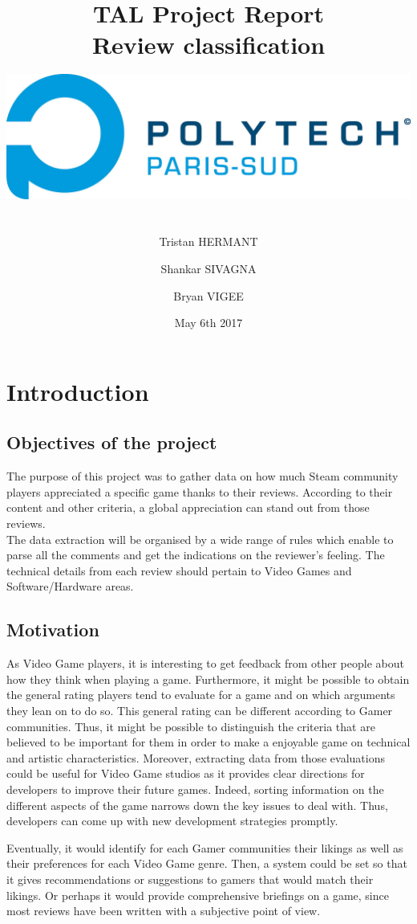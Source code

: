 \documentclass[paper=a4,fontsize=12pt]{report}
\title{ \LARGE \textbf{TAL Project Report
\\Review classification} \\
\includegraphics[width=15cm,height=5cm]{POLYTECH_PARIS-SUD_RVB.jpg}}
\author{\large Tristan HERMANT
\and
Shankar SIVAGNA
\and
Bryan VIGEE}
\date{May 6th 2017}
\begin{document}
\maketitle

\tableofcontents
\setcounter{page}{1}
\chapter{Introduction}
\section{Objectives of the project}
	The purpose of this project was to gather data on how much Steam community players appreciated a specific game thanks to their reviews. According to their content and other criteria, a global appreciation can stand out from those reviews. \\ \linebreak
The data extraction will be organised by a wide range of rules which enable to parse all the comments and get the indications on the reviewer's feeling. The technical details from each review should pertain to Video Games and Software/Hardware areas. 

	
\section{Motivation}
	As Video Game players, it is interesting to get feedback from other people about how they think when playing a game. Furthermore, it might be possible to obtain the general rating players tend to evaluate for a game and on which arguments they lean on to do so.  This general rating can be different according to Gamer communities. Thus, it might be possible to distinguish the criteria that are believed to be important for them in order to make a enjoyable game on technical and artistic characteristics.
\linebreak \linebreak
	Moreover, extracting data from those evaluations could be useful for Video Game studios as it provides clear directions for developers to improve their future games. Indeed, sorting information on the different aspects of the game narrows down the key issues to deal with. Thus, developers  can come up with new development strategies promptly.

Eventually, it would identify for each Gamer communities their likings as well as their preferences for each Video Game genre.  Then, a system could be set so that it gives recommendations or suggestions to gamers that would match their likings. Or perhaps it would provide comprehensive briefings on a game, since most reviews have been written with a subjective point of view.\linebreak 
\end{document}
